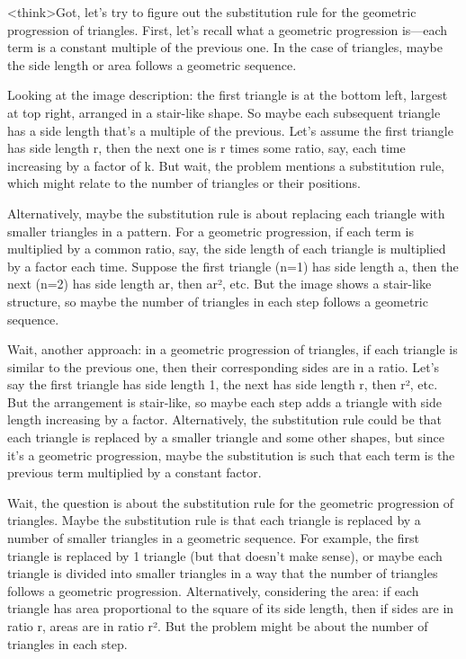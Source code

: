 <think>Got, let's try to figure out the substitution rule for the geometric progression of triangles. First, let's recall what a geometric progression is—each term is a constant multiple of the previous one. In the case of triangles, maybe the side length or area follows a geometric sequence. 

Looking at the image description: the first triangle is at the bottom left, largest at top right, arranged in a stair-like shape. So maybe each subsequent triangle has a side length that's a multiple of the previous. Let's assume the first triangle has side length r, then the next one is r times some ratio, say, each time increasing by a factor of k. But wait, the problem mentions a substitution rule, which might relate to the number of triangles or their positions. 

Alternatively, maybe the substitution rule is about replacing each triangle with smaller triangles in a pattern. For a geometric progression, if each term is multiplied by a common ratio, say, the side length of each triangle is multiplied by a factor each time. Suppose the first triangle (n=1) has side length a, then the next (n=2) has side length ar, then ar², etc. But the image shows a stair-like structure, so maybe the number of triangles in each step follows a geometric sequence. 

Wait, another approach: in a geometric progression of triangles, if each triangle is similar to the previous one, then their corresponding sides are in a ratio. Let's say the first triangle has side length 1, the next has side length r, then r², etc. But the arrangement is stair-like, so maybe each step adds a triangle with side length increasing by a factor. Alternatively, the substitution rule could be that each triangle is replaced by a smaller triangle and some other shapes, but since it's a geometric progression, maybe the substitution is such that each term is the previous term multiplied by a constant factor. 

Wait, the question is about the substitution rule for the geometric progression of triangles. Maybe the substitution rule is that each triangle is replaced by a number of smaller triangles in a geometric sequence. For example, the first triangle is replaced by 1 triangle (but that doesn't make sense), or maybe each triangle is divided into smaller triangles in a way that the number of triangles follows a geometric progression. Alternatively, considering the area: if each triangle has area proportional to the square of its side length, then if sides are in ratio r, areas are in ratio r². But the problem might be about the number of triangles in each step. 

